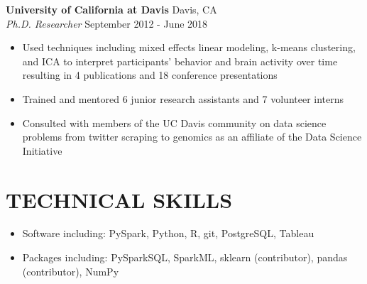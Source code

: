 \documentclass[line,margin,10pt]{res}
\begin{document}
\begin{resume}
\begin{itemize}
\end{itemize}
{\vspace{-0.25cm}}
\textbf{University of California at Davis} \hfill Davis, CA \\
{\sl Ph.D. Researcher} \hfill September 2012 - June 2018
\begin{itemize} \itemsep -2pt
\item Used techniques including mixed effects linear modeling, k-means clustering, and ICA to interpret participants' behavior and brain activity over time resulting in 4 publications and 18 conference presentations
\item Trained and mentored 6 junior research assistants and 7 volunteer interns
\item Consulted with members of the UC Davis community on data science problems from twitter scraping to genomics as an affiliate of the Data Science Initiative
\end{itemize}
{\vspace{-0.25cm}}


 \section{TECHNICAL SKILLS} 
 \begin{itemize}[leftmargin=-2pt] \itemsep -2pt
\item [] Software including: PySpark, Python, R, git, PostgreSQL, Tableau
\item []Packages including: PySparkSQL, SparkML, sklearn (contributor), pandas (contributor), NumPy%
 \end{itemize}
{\vspace{-0.25cm}}


\end{resume}
\end{document}
